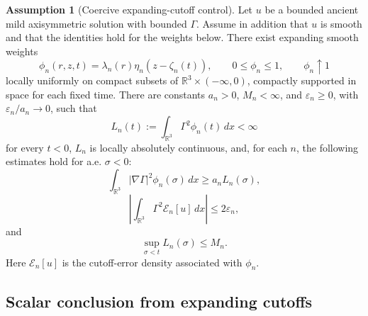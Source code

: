 \documentclass[11pt]{amsart}
\theoremstyle{plain}
\theoremstyle{definition}
\newtheorem{assumption}[theorem]{Assumption}
\theoremstyle{remark}
\numberwithin{equation}{section}
\begin{document}
\begin{assumption}[Coercive expanding-cutoff control]\label{ass:shell-control}
Let \(u\) be a bounded ancient mild axisymmetric solution with bounded
\(\Gamma\).  Assume in addition that \(u\) is smooth and that the identities
 hold for the weights
below.  There exist expanding smooth weights
\[
   \phi_n(r,z,t)=\lambda_n(r)\eta_n(z-\zeta_n(t)),
   \qquad 0\le\phi_n\le1,\qquad \phi_n\uparrow1
\]
locally uniformly on compact subsets of
\(\mathbb R^3\times(-\infty,0)\), compactly supported in space for each fixed
time.  There are constants \(a_n>0\), \(M_n<\infty\), and
\(\varepsilon_n\ge0\), with \(\varepsilon_n/a_n\to0\), such that
\[
   L_n(t):=\int_{\mathbb R^3}\Gamma^2\phi_n(t)\,dx<\infty
\]
for every \(t<0\), \(L_n\) is locally absolutely continuous, and, for each
\(n\), the following estimates hold for a.e. \(\sigma<0\):
\begin{equation}\label{eq:shell-coercive}
   \int_{\mathbb R^3}|\nabla\Gamma|^2\phi_n(\sigma)\,dx
   \ge
   a_n L_n(\sigma),
\end{equation}
\begin{equation}\label{eq:shell-error-bound}
   \left|
   \int_{\mathbb R^3}\Gamma^2\mathcal E_n[u]\,dx
   \right|
   \le
   2\varepsilon_n,
\end{equation}
and
\begin{equation}\label{eq:shell-past-bound}
   \sup_{\sigma<t}L_n(\sigma)\le M_n .
\end{equation}
Here \(\mathcal E_n[u]\) is the cutoff-error density associated with
\(\phi_n\).
\end{assumption}

\subsection{Scalar conclusion from expanding cutoffs}
\end{document}
